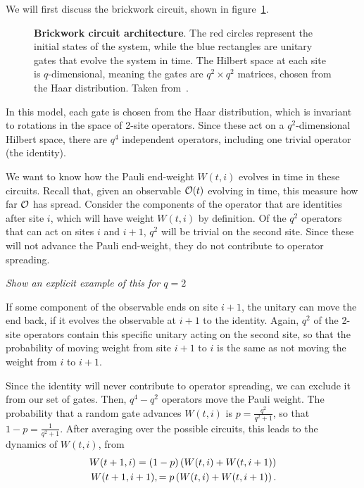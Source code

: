 We will first discuss the brickwork circuit, shown in figure~\ref{fig:brickcircuit}.
\begin{figure}
	\centering
	
	\caption{\textbf{Brickwork circuit architecture}. The red circles represent the initial states of the system, while the blue rectangles are unitary gates that evolve the system in time. The Hilbert space at each site is $q$-dimensional, meaning the gates are $q^2\times q^2$ matrices, chosen from the Haar distribution. Taken from~\cite{Keyserlingk}.}
	\label{fig:brickcircuit}
\end{figure}
In this model, each gate is chosen from the Haar distribution, which is invariant to rotations in the space of 2-site operators. Since these act on a $q^2$-dimensional Hilbert space, there are $q^4$ independent operators, including one trivial operator (the identity). 

We want to know how the Pauli end-weight $W(t,i)$ evolves in time in these circuits. Recall that, given an observable $\cal{O}(t)$ evolving in time, this measure how far $\cal{O}$ has spread. Consider the components of the operator that are identities after site $i$, which will have weight $W(t, i)$ by definition. Of the $q^2$ operators that can act on sites $i$ and $i+1$, $q^2$ will be trivial on the second site. Since these will not advance the Pauli end-weight, they do not contribute to operator spreading. 

\emph{Show an explicit example of this for $q=2$}

If some component of the observable ends on site $i+1$, the unitary can move the end back, if it evolves the observable at $i+1$ to the identity. Again, $q^2$ of the 2-site operators contain this specific unitary acting on the second site, so that the probability of moving weight from site $i+1$ to $i$ is the same as not moving the weight from $i$ to $i+1$.

Since the identity will never contribute to operator spreading, we can exclude it from our set of gates. Then, $q^4-q^2$ operators move the Pauli weight. The probability that a random gate advances $W(t,i)$ is $p = \frac{q^2}{q^2+1}$, so that $1-p = \frac{1}{q^2+1}$. After averaging over the possible circuits, this leads to the dynamics of $W(t,i)$, from~\cite{Keyserlingk}
\begin{align}
W(t+1, i) = (1-p)\left(W(t, i) + W(t, i+1)\right)\nn
W(t+1, i+1), = p\left(W(t, i) + W(t, i+1)\right).
\end{align}


